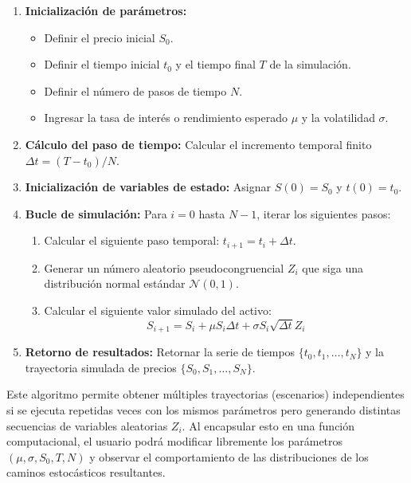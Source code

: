 \documentclass[12pt]{article}
\begin{document}
\begin{enumerate}
    \item \textbf{Inicialización de parámetros:}
    \begin{itemize}
        \item Definir el precio inicial $S_0$.
        \item Definir el tiempo inicial $t_0$ y el tiempo final $T$ de la simulación.
        \item Definir el número de pasos de tiempo $N$.
        \item Ingresar la tasa de interés o rendimiento esperado $\mu$ y la volatilidad $\sigma$.
    \end{itemize}
    \item \textbf{Cálculo del paso de tiempo:} Calcular el incremento temporal finito $\Delta t = (T - t_0) / N$.
    \item \textbf{Inicialización de variables de estado:} Asignar $S(0) = S_0$ y $t(0) = t_0$.
    \item \textbf{Bucle de simulación:} Para $i = 0$ hasta $N-1$, iterar los siguientes pasos:
    \begin{enumerate}
        \item Calcular el siguiente paso temporal: $t_{i+1} = t_i + \Delta t$.
        \item Generar un número aleatorio pseudocongruencial $Z_i$ que siga una distribución normal estándar $\mathcal{N}(0,1)$.
        \item Calcular el siguiente valor simulado del activo:
        \begin{equation*}
        S_{i+1} = S_i + \mu S_i \Delta t + \sigma S_i \sqrt{\Delta t} Z_i
        \end{equation*}
    \end{enumerate}
    \item \textbf{Retorno de resultados:} Retornar la serie de tiempos $\{t_0, t_1, \dots, t_N\}$ y la trayectoria simulada de precios $\{S_0, S_1, \dots, S_N\}$.
\end{enumerate}

Este algoritmo permite obtener múltiples trayectorias (escenarios) independientes si se ejecuta repetidas veces con los mismos parámetros pero generando distintas secuencias de variables aleatorias $Z_i$. Al encapsular esto en una función computacional, el usuario podrá modificar libremente los parámetros $(\mu, \sigma, S_0, T, N)$ y observar el comportamiento de las distribuciones de los caminos estocásticos resultantes.
\end{document}
